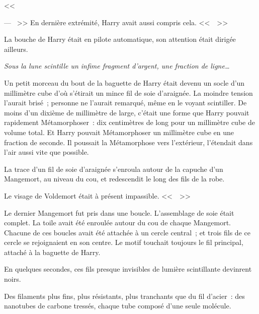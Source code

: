 <<~

--- ~>> En dernière extrémité, Harry avait aussi compris cela. <<~~>>

La bouche de Harry était en pilote automatique, son attention était dirigée ailleurs.

\emph{Sous la lune scintille un infime fragment d'argent, une fraction de ligne…}

Un petit morceau du bout de la baguette de Harry était devenu un socle d'un millimètre cube d'où s'étirait un mince fil de soie d'araignée. La moindre tension l'aurait brisé~; personne ne l'aurait remarqué, même en le voyant scintiller. De moins d'un dixième de millimètre de large, c'était une forme que Harry pouvait rapidement Métamorphoser~: dix centimètres de long pour un millimètre cube de volume total. Et Harry pouvait Métamorphoser un millimètre cube en une fraction de seconde. Il poussait la Métamorphose vers l'extérieur, l'étendait dans l'air aussi vite que possible.

La trace d'un fil de soie d'araignée s'enroula autour de la capuche d'un Mangemort, au niveau du cou, et redescendit le long des fils de la robe.

Le visage de Voldemort était à présent impassible. <<~~>>

Le dernier Mangemort fut pris dans une boucle. L'assemblage de soie était complet. La toile avait été enroulée autour du cou de chaque Mangemort. Chacune de ces boucles avait été attachée à un cercle central~; et trois fils de ce cercle se rejoignaient en son centre. Le motif touchait toujours le fil principal, attaché à la baguette de Harry.

En quelques secondes, ces fils presque invisibles de lumière scintillante devinrent noirs.

Des filaments plus fins, plus résistants, plus tranchants que du fil d'acier~: des nanotubes de carbone tressés, chaque tube composé d'une seule molécule.

